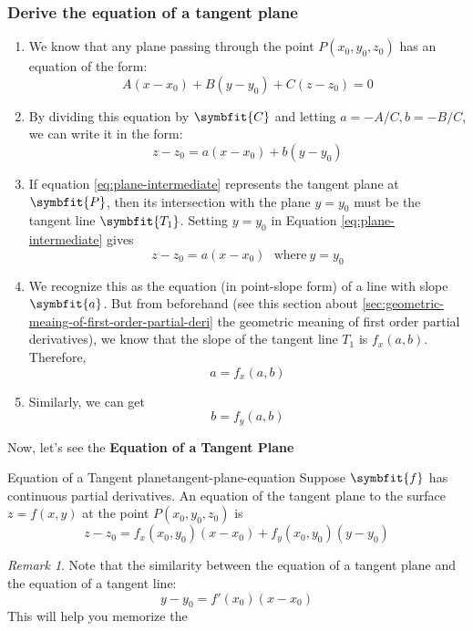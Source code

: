 \documentclass[math,code]{amznotes}
\theoremstyle{remark}
\newtheorem*{remark}{Remark}
\begin{document}
\subsubsection{Derive the equation of a tangent plane}
\begin{enumerate}
    \item We know that any plane passing through the point $P(x_0,y_0,z_0)$ has an equation of the form:
    \begin{displaymath}
        A(x-x_0)+B(y-y_0)+C(z-z_0)=0
    \end{displaymath}
    \item By dividing this equation by $\symbfit{C}$ and letting $a=-A/C, b=-B/C$, we can write it in the form:
    \begin{equation} \label{eq:plane-intermediate}
        z-z_0=a(x-x_0)+b(y-y_0)
    \end{equation}
    \item If equation \eqref{eq:plane-intermediate} represents the tangent plane at $\symbfit{P}$, then its intersection with the plane $y=y_0$ must be the tangent line $\symbfit{T_1}$. Setting $y=y_0$ in Equation \eqref{eq:plane-intermediate} gives
    \begin{displaymath}
        z-z_0=a(x-x_0) ~~~\text{where}~ y=y_0
    \end{displaymath}
    \item We recognize this as the equation (in point-slope form) of a line with slope $\symbfit{a}$. But from beforehand (see this section about \ref{sec:geometric-meaing-of-first-order-partial-deri} the geometric meaning of first order partial derivatives), we know that the slope of the tangent line $T_1$ is $f_x(a,b)$. Therefore,
    \begin{displaymath}
        a=f_x(a,b)
    \end{displaymath}
    \item Similarly, we can get
    \begin{displaymath}
        b=f_y(a,b)
    \end{displaymath}
\end{enumerate}
Now, let's see the {\color{red} \textbf{Equation of a Tangent Plane}}
\begin{thmbox}{Equation of a Tangent plane}{tangent-plane-equation}
    Suppose $\symbfit{f}$ has continuous partial derivatives. An equation of the tangent plane to the surface $z=f(x,y)$ at the point $P(x_0,y_0,z_0)$ is
    \begin{equation} \label{eq:equation-of-tangent-plane-special}
        z-z_0=f_x(x_0,y_0)(x-x_0)+f_y(x_0,y_0)(y-y_0)
    \end{equation}
\end{thmbox}
\begin{notebox}
    \begin{remark}
        Note that the similarity between the equation of a tangent plane and the equation of a tangent line:
        \begin{displaymath}
            y-y_0=f'(x_0)(x-x_0)
        \end{displaymath}
        This will help you memorize the 
    \end{remark}
\end{notebox}
\end{document}
